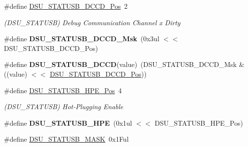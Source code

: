 \begin{DoxyCompactItemize}
\item 
\hypertarget{group___s_a_m_l21___d_s_u_ga93a180646ddd3ecc99793ef1b5bde5aa}{}\#define \hyperlink{group___s_a_m_l21___d_s_u_ga93a180646ddd3ecc99793ef1b5bde5aa}{D\+S\+U\+\_\+\+S\+T\+A\+T\+U\+S\+B\+\_\+\+D\+C\+C\+D\+\_\+\+Pos}~2\label{group___s_a_m_l21___d_s_u_ga93a180646ddd3ecc99793ef1b5bde5aa}

\begin{DoxyCompactList}\small\item\em (D\+S\+U\+\_\+\+S\+T\+A\+T\+U\+S\+B) Debug Communication Channel x Dirty \end{DoxyCompactList}\item 
\hypertarget{group___s_a_m_l21___d_s_u_ga044e55aae67a53e47ac714df1cfda6da}{}\#define {\bfseries D\+S\+U\+\_\+\+S\+T\+A\+T\+U\+S\+B\+\_\+\+D\+C\+C\+D\+\_\+\+Msk}~(0x3ul $<$$<$ D\+S\+U\+\_\+\+S\+T\+A\+T\+U\+S\+B\+\_\+\+D\+C\+C\+D\+\_\+\+Pos)\label{group___s_a_m_l21___d_s_u_ga044e55aae67a53e47ac714df1cfda6da}

\item 
\hypertarget{group___s_a_m_l21___d_s_u_gaef2128822b4dc82be7e1c4971676c6ad}{}\#define {\bfseries D\+S\+U\+\_\+\+S\+T\+A\+T\+U\+S\+B\+\_\+\+D\+C\+C\+D}(value)~(D\+S\+U\+\_\+\+S\+T\+A\+T\+U\+S\+B\+\_\+\+D\+C\+C\+D\+\_\+\+Msk \& ((value) $<$$<$ \hyperlink{group___s_a_m_l21___d_s_u_ga93a180646ddd3ecc99793ef1b5bde5aa}{D\+S\+U\+\_\+\+S\+T\+A\+T\+U\+S\+B\+\_\+\+D\+C\+C\+D\+\_\+\+Pos}))\label{group___s_a_m_l21___d_s_u_gaef2128822b4dc82be7e1c4971676c6ad}

\item 
\hypertarget{group___s_a_m_l21___d_s_u_ga99433528b614cd9294b33c828a1a5003}{}\#define \hyperlink{group___s_a_m_l21___d_s_u_ga99433528b614cd9294b33c828a1a5003}{D\+S\+U\+\_\+\+S\+T\+A\+T\+U\+S\+B\+\_\+\+H\+P\+E\+\_\+\+Pos}~4\label{group___s_a_m_l21___d_s_u_ga99433528b614cd9294b33c828a1a5003}

\begin{DoxyCompactList}\small\item\em (D\+S\+U\+\_\+\+S\+T\+A\+T\+U\+S\+B) Hot-\/\+Plugging Enable \end{DoxyCompactList}\item 
\hypertarget{group___s_a_m_l21___d_s_u_gab622c042fd6dd7d2d8b619ab875d2cda}{}\#define {\bfseries D\+S\+U\+\_\+\+S\+T\+A\+T\+U\+S\+B\+\_\+\+H\+P\+E}~(0x1ul $<$$<$ D\+S\+U\+\_\+\+S\+T\+A\+T\+U\+S\+B\+\_\+\+H\+P\+E\+\_\+\+Pos)\label{group___s_a_m_l21___d_s_u_gab622c042fd6dd7d2d8b619ab875d2cda}

\item 
\hypertarget{group___s_a_m_l21___d_s_u_ga81d42e65d6d856087a32f89cd8ebcc23}{}\#define \hyperlink{group___s_a_m_l21___d_s_u_ga81d42e65d6d856087a32f89cd8ebcc23}{D\+S\+U\+\_\+\+S\+T\+A\+T\+U\+S\+B\+\_\+\+M\+A\+S\+K}~0x1\+Ful\label{group___s_a_m_l21___d_s_u_ga81d42e65d6d856087a32f89cd8ebcc23}


\end{DoxyCompactItemize}
